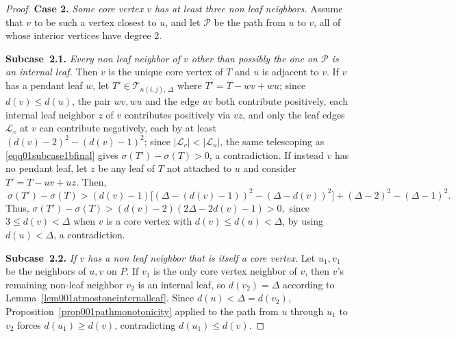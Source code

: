 \documentclass[12pt]{amsart}
\newcommand{\TT}{\mathcal{T}}
\begin{document}
\begin{proof}
\medskip

\noindent \textbf{Case 2.} \textit{Some core vertex $v$ has at least three non leaf neighbors.} Assume that $v$ to be such a vertex closest to $u$, and let $\mathcal P$ be the path from $u$ to $v$, all of whose interior vertices have degree $2$.

\smallskip

\textbf{Subcase~2.1.} \emph{Every non leaf neighbor of $v$ other than possibly the one
on $\mathcal P$ is an internal leaf.}  Then $v$ is the unique core vertex of $T$ and $u$
is adjacent to $v$. If $v$ has a pendant leaf $w$, let $T'\in \TT_{n(i,j),\,\Delta}$ where $T'=T-wv+wu$; since
$d(v)\leqslant d(u)$, the pair $wv,wu$ and the edge $uv$ both contribute positively,
each internal leaf neighbor $z$ of $v$   contributes positively via $vz$,
and only the leaf edges $\mathcal L_v$ at $v$  can contribute
negatively, each by at least $(d(v)-2)^2-(d(v)-1)^2$; since
$|\mathcal L_v|<|\mathcal L_u|$, the same telescoping as
\eqref{eqq01subcase1bfinal} gives $\sigma(T')-\sigma(T)>0$, a contradiction.
If instead $v$ has no pendant leaf, let $z$ be any leaf of $T$ not attached to
$u$ and consider $T'=T-uv+uz$. Then, 
\begin{equation}~\label{eqq01subcase2anoleaf}
\sigma(T')-\sigma(T) >
(d(v)-1)\Big[(\Delta\!-\!(d(v)\!-\!1))^2\!-\!(\Delta\!-\!d(v))^2\Big]
\!+\!(\Delta\!-\!2)^2\!-\!(\Delta\!-\!1)^2.
\end{equation}
Thus, $\sigma(T')-\sigma(T) >(d(v)-2)(2\Delta-2d(v)-1) > 0,$
since $3\leqslant d(v)<\Delta$ when $v$ is a core vertex with $d(v)\leqslant d(u)<\Delta$,
 by using $d(u)<\Delta$, a contradiction.

\smallskip

\textbf{Subcase~2.2.} \emph{If $v$ has a non leaf neighbor that is itself a core vertex.} 
Let $u_1,v_1$ be the neighbors of $u,v$ on $P$. If $v_1$ is the only
core vertex neighbor of $v$, then $v$'s remaining non-leaf neighbor $v_2$ is
an internal leaf, so $d(v_2)=\Delta$ according to
Lemma~\ref{lem001atmostoneinternalleaf}. Since $d(u)<\Delta=d(v_2)$,
Proposition~\ref{prop001pathmonotonicity} applied to the path from $u$ through
$u_1$ to $v_2$   forces $d(u_1)\geqslant d(v)$, contradicting
$d(u_1)\leqslant d(v)$.


\end{proof}
\end{document}
